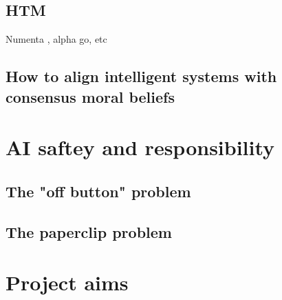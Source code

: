 \subsection{HTM}
Numenta \cite{numentahome}, alpha go, etc
\subsection{How to align intelligent systems with consensus moral beliefs}

\section{AI saftey and responsibility}
\subsection{The "off button" problem}
\subsection{The paperclip problem}

\section{Project aims}
